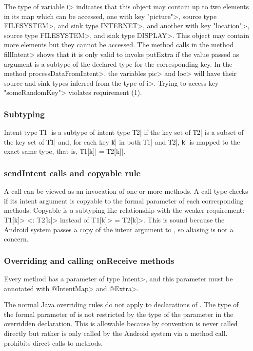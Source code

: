 \noindent
The type of variable \<i> indicates that this object may contain up to two
elements in its map which can be accessed, one with key \<"picture">,
source type \<FILESYSTEM>, and sink type
\<INTERNET>, and another with key \<"location">, source type \<FILESYSTEM>, and sink
type \<DISPLAY>. This object may contain more elements but they cannot be
accessed. The method calls in the method \<fillIntent> shows that it is only
valid to invoke putExtra if the value passed as argument is a subtype of the
declared type for the corresponding key. In the method \<processDataFromIntent>,
the variables \<pic> and \<loc> will have their source and sink types
inferred from the type of \<i>. Trying to access key \<"someRandomKey"> violates
requirement (1).


\subsubsection{Subtyping}
Intent type \|T1| is a subtype of intent type \|T2| if the key set of 
\|T2| is a subset of the key set of \|T1| and, for each key \|k| in both 
\|T1| and \|T2|, \|k| is mapped to the exact same type, that is, 
\|T1[k]| = \|T2[k]|.

\subsubsection{sendIntent calls and copyable rule}
A \sendIntent{} call can be viewed as an invocation of one or more \onReceive{} methods.
A \sendIntent{} call type-checks if its intent argument is
copyable to the formal parameter of each corresponding \onReceive{} methods.
Copyable is a subtyping-like relationship with the weaker requirement: 
\<T1[k]> <: \<T2[k]> instead of \<T1[k]> = \<T2[k]>.
This is sound because the Android system passes a copy of the intent argument to
\onReceive{}, so aliasing is not a concern.

\subsubsection{Overriding and calling onReceive methods\label{override-onreceive}}
Every \onReceive{} method has a parameter of type \<Intent>, and this
parameter must be annotated with \<@IntentMap> and \<@Extra>.

The normal Java overriding rules do not apply to declarations of \onReceive{}. The
type of the formal parameter of \onReceive{} is not restricted by the type of the
parameter in the overridden declaration. This is allowable because by convention
\onReceive{} is never called directly but rather is only called by the Android
system via a \sendIntent{} method call. \TheIntentChecker{} prohibits direct
calls to \onReceive{} methods.

